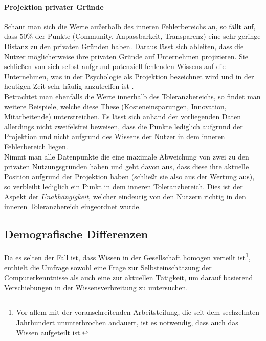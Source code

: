 \documentclass[a4paper]{article}
\begin{document}
                \paragraph{Projektion privater Gründe}
                    Schaut man sich die Werte außerhalb des inneren Fehlerbereichs an, so fällt auf, dass $50 \%$ der Punkte ({\scriptsize Community, Anpassbarkeit, Transparenz}) eine sehr geringe Distanz zu den privaten Gründen haben. Daraus lässt sich ableiten, dass die Nutzer möglicherweise ihre privaten Gründe auf Unternehmen projizieren. Sie schließen von sich selbst aufgrund potenziell fehlenden Wissens auf die Unternehmen, was in der Psychologie als Projektion bezeichnet wird und in der heutigen Zeit sehr häufig anzutreffen ist \cite{psychology:freud-defense-projection}.\\
                    Betrachtet man ebenfalls die Werte innerhalb des Toleranzbereichs, so findet man weitere Beispiele, welche diese These ({\scriptsize Kosteneinsparungen, Innovation, Mitarbeitende}) unterstreichen. Es lässt sich anhand der vorliegenden Daten allerdings nicht zweifelsfrei beweisen, dass die Punkte lediglich aufgrund der Projektion und nicht aufgrund des Wissens der Nutzer in dem inneren Fehlerbereich liegen.\\
                    Nimmt man alle Datenpunkte die eine maximale Abweichung von zwei zu den privaten Nutzungsgründen haben und geht davon aus, dass diese ihre aktuelle Position aufgrund der Projektion haben (schließt sie also aus der Wertung aus), so verbleibt lediglich ein Punkt in dem inneren Toleranzbereich. Dies ist der Aspekt der \emph{Unabhängigkeit}, welcher eindeutig von den Nutzern richtig in den inneren Toleranzbereich eingeordnet wurde.

        \subsection{Demografische Differenzen}
            Da es selten der Fall ist, dass Wissen in der Gesellschaft homogen verteilt ist\footnote{Vor allem mit der voranschreitenden Arbeitsteilung, die seit dem sechzehnten Jahrhundert ununterbrochen andauert, ist es notwendig, dass auch das Wissen aufgeteilt ist\cite{mckeon:divison_of_knowledge}.}, enthielt die Umfrage sowohl eine Frage zur Selbsteinschätzung der Computerkenntnisse als auch eine zur aktuellen Tätigkeit, um darauf basierend Verschiebungen in der Wissensverbreitung zu untersuchen.
            
\end{document}
